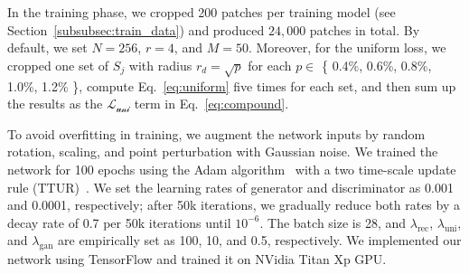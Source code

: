 





In the training phase, we cropped 200 patches per training model (see Section~\ref{subsubsec:train_data}) and produced $24,000$ patches in total.
By default, we set $N=256$, $r=4$, and $M=50$.
Moreover, for the uniform loss, we cropped one set of $S_j$ with radius $r_d=\sqrt{p}$ for each $p \in$ \{ 0.4\%, 0.6\%, 0.8\%, 1.0\%, 1.2\% \}, compute Eq.~\eqref{eq:uniform} five times for each set, and then sum up the results as the $\mathcal{L_{\text{uni}}}$ term in Eq.~\eqref{eq:compound}.

To avoid overfitting in training, we augment the network inputs by random rotation, scaling, and point perturbation with Gaussian noise.
We trained the network for 100 epochs using the Adam algorithm~\cite{kingma2014adam} with a two time-scale update rule (TTUR)~\cite{heusel2017gans}.
We set the learning rates of generator and discriminator as 0.001 and 0.0001, respectively; after 50k iterations, we gradually reduce both rates by a decay rate of 0.7 per 50k iterations until $10^{-6}$.
The batch size is 28, and $\lambda_{\text{rec}}$, $\lambda_{\text{uni}}$, and $\lambda_{\text{gan}}$ are empirically set as 100, 10, and 0.5, respectively.
We implemented our network using TensorFlow and trained it on NVidia Titan Xp GPU.

